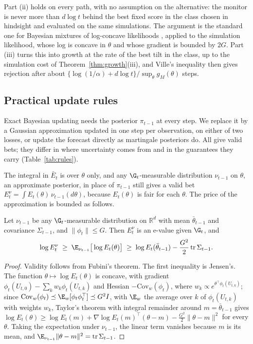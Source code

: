 Part (ii) holds on every path, with no assumption on the alternative: the
monitor is never more than $d\log t$ behind the best fixed score in the class
chosen in hindsight and evaluated on the same simulations. The argument is the
standard one for Bayesian mixtures of log-concave likelihoods
\citep{kakade2005online,grunwald2007minimum}, applied to the simulation
likelihood, whose log is concave in $\theta$ and whose gradient is bounded by
$2G$. Part (iii) turns this into growth at the rate of the best tilt in the
class, up to the simulation cost of Theorem~\ref{thm:growth}(iii), and
Ville's inequality then gives rejection after about
$\{\log(1/\alpha) + d\log t\}/\sup_\theta g_M(\theta)$ steps.

\subsection{Practical update rules}\label{sec:blr}\label{sec:algorithm}

Exact Bayesian updating needs the posterior $\pi_{t-1}$ at every step. We
replace it by a Gaussian approximation updated in one step per observation,
on either of two losses, or update the forecast directly as martingale
posteriors do. All give valid bets; they differ in where uncertainty comes from
and in the guarantees they carry (Table~\ref{tab:rules}).

The integral in $\bar E_t$ is over $\theta$ only, and any $\G_t$-measurable
distribution $\nu_{t-1}$ on $\theta$, an approximate posterior, in place of
$\pi_{t-1}$ still gives a valid bet
$E^{\nu}_t = \int E_t(\theta)\,\nu_{t-1}(d\theta)$, because $E_t(\theta)$ is
fair for each $\theta$. The price of the approximation is bounded as follows.

\begin{proposition}\label{prop:approx}
Let $\nu_{t-1}$ be any $\G_t$-measurable distribution on $\mathbb{R}^d$ with mean
$\bar\theta_{t-1}$ and covariance $\Sigma_{t-1}$, and $\|\phi_t\| \le G$. Then
$E^{\nu}_t$ is an e-value given $\G_t$, and
\[
\log E^{\nu}_t \;\ge\; \E_{\nu_{t-1}}\big[\log E_t(\theta)\big]
\;\ge\; \log E_t(\bar\theta_{t-1}) - \frac{G^2}{2}\,\mathrm{tr}\,\Sigma_{t-1}.
\]
\end{proposition}

\begin{proof}
Validity follows from Fubini's theorem. The first inequality is Jensen's.
The function $\theta \mapsto \log E_t(\theta)$ is concave, with gradient
$\phi_t(U_{t,0}) - \sum_k w_k \phi_t(U_{t,k})$ and Hessian
$-\mathrm{Cov}_w(\phi_t)$, where $w_k \propto e^{\theta^\top\phi_t(U_{t,k})}$;
since $\mathrm{Cov}_w(\phi_t) \preceq \E_w[\phi_t\phi_t^\top] \preceq G^2 I$, with $\E_w$
the average over $k$ of $\phi_t(U_{t,k})$ with weights $w_k$,
Taylor's theorem with integral remainder around $m = \bar\theta_{t-1}$ gives
$\log E_t(\theta) \ge \log E_t(m) + \nabla\log E_t(m)^\top(\theta - m)
- \frac{G^2}{2}\|\theta - m\|^2$ for every $\theta$. Taking the expectation
under $\nu_{t-1}$, the linear term vanishes because $m$ is its mean, and
$\E_{\nu_{t-1}}\|\theta - m\|^2 = \mathrm{tr}\,\Sigma_{t-1}$.
\end{proof}

